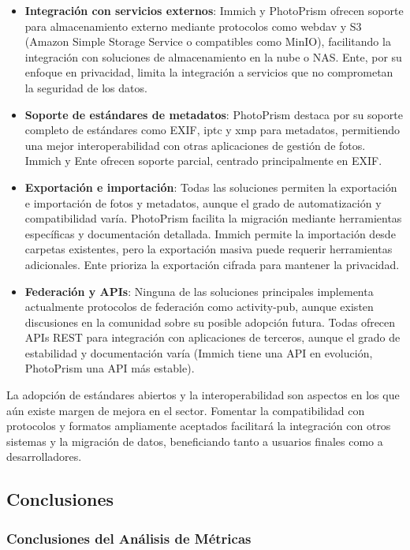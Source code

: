\begin{itemize}
    \item \textbf{Integración con servicios externos}: Immich y PhotoPrism ofrecen soporte para almacenamiento externo mediante protocolos como \gls{webdav} y S3 (Amazon Simple Storage Service o compatibles como MinIO), facilitando la integración con soluciones de almacenamiento en la nube o NAS. Ente, por su enfoque en privacidad, limita la integración a servicios que no comprometan la seguridad de los datos.
    \item \textbf{Soporte de estándares de metadatos}: PhotoPrism destaca por su soporte completo de estándares como EXIF, \acrshort{iptc} y \acrshort{xmp} para metadatos, permitiendo una mejor interoperabilidad con otras aplicaciones de gestión de fotos. Immich y Ente ofrecen soporte parcial, centrado principalmente en EXIF.
    \item \textbf{Exportación e importación}: Todas las soluciones permiten la exportación e importación de fotos y metadatos, aunque el grado de automatización y compatibilidad varía. PhotoPrism facilita la migración mediante herramientas específicas y documentación detallada. Immich permite la importación desde carpetas existentes, pero la exportación masiva puede requerir herramientas adicionales. Ente prioriza la exportación cifrada para mantener la privacidad.
    \item \textbf{Federación y APIs}: Ninguna de las soluciones principales implementa actualmente protocolos de federación como \gls{activity-pub}, aunque existen discusiones en la comunidad sobre su posible adopción futura. Todas ofrecen APIs REST para integración con aplicaciones de terceros, aunque el grado de estabilidad y documentación varía (Immich tiene una API en evolución, PhotoPrism una API más estable).
\end{itemize}

La adopción de estándares abiertos y la interoperabilidad son aspectos en los que aún existe margen de mejora en el sector. Fomentar la compatibilidad con protocolos y formatos ampliamente aceptados facilitará la integración con otros sistemas y la migración de datos, beneficiando tanto a usuarios finales como a desarrolladores.


\subsection{Conclusiones}
\subsubsection{Conclusiones del Análisis de Métricas}

